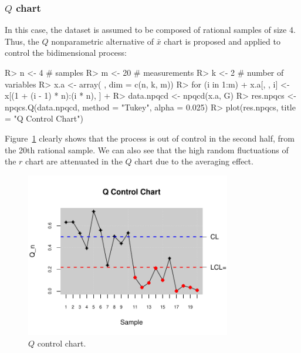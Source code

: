 \subsubsection{$Q$ chart}
In this case, the dataset is assumed to be composed of rational samples of size 4. 
Thus, the $Q$ nonparametric alternative of $\bar{x}$ chart is proposed and applied to control the bidimensional process:
\begin{example}
R> n <- 4    # samples
R> m <- 20   # measurements
R> k <- 2    # number of variables
R> x.a <- array( , dim = c(n, k, m))
R> for (i in 1:m) {
+      x.a[, , i] <- x[(1 + (i - 1) * n):(i * n), ]
+  }
R> data.npqcd <- npqcd(x.a, G)
R> res.npqcs <- npqcs.Q(data.npqcd, method = "Tukey", alpha = 0.025)
R> plot(res.npqcs, title = "Q Control Chart")
\end{example}
Figure~\ref{fig:Qchart} clearly shows that the process is out of control in the second half, from the 20th rational sample. 
We can also see that the high random fluctuations of the $r$ chart are attenuated in the $Q$ chart due to the averaging effect.
\begin{figure}[!htb]
\begin{center}
\includegraphics[width=0.8\textwidth]{article-Qchart-plot}
\caption{$Q$ control chart.}
\label{fig:Qchart}
\end{center}
\end{figure}



